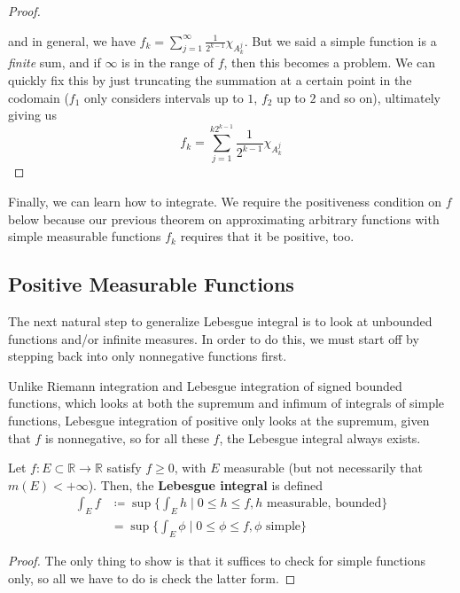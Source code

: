 \begin{proof}
\begin{center}
    \end{center}
    and in general, we have $f_k = \sum_{j=1}^\infty \frac{1}{2^{k-1}} \chi_{A^j_k}$. But we said a simple function is a \textit{finite} sum, and if $\infty$ is in the range of $f$, then this becomes a problem. We can quickly fix this by just truncating the summation at a certain point in the codomain ($f_1$ only considers intervals up to $1$, $f_2$ up to $2$ and so on), ultimately giving us 
    \begin{equation}
      f_k = \sum_{j=1}^{k 2^{k-1}} \frac{1}{2^{k-1}} \chi_{A^j_k} 
    \end{equation}
  \end{proof}

  Finally, we can learn how to integrate. We require the positiveness condition on $f$ below because our previous theorem on approximating arbitrary functions with simple measurable functions $f_k$ requires that it be positive, too. 

\subsection{Positive Measurable Functions} 

  The next natural step to generalize Lebesgue integral is to look at unbounded functions and/or infinite measures. In order to do this, we must start off by stepping back into only nonnegative functions first.

  Unlike Riemann integration and Lebesgue integration of signed bounded functions, which looks at both the supremum and infimum of integrals of simple functions, Lebesgue integration of positive only looks at the supremum, given that $f$ is nonnegative, so for all these $f$, the Lebesgue integral always exists. 

  \begin{definition}
    Let $f: E \subset \mathbb{R} \to \mathbb{R}$ satisfy $f \geq 0$, with $E$ measurable (but not necessarily that $m(E) < +\infty$). Then, the \textbf{Lebesgue integral} is defined 
    \begin{align}
      \int_E f & \coloneqq \sup \bigg\{ \int_E h \; \bigg| \; 0 \leq h \leq f, h \text{ measurable, bounded} \bigg\} \\ 
               & = \sup \bigg\{ \int_E \phi \; \bigg| \; 0 \leq \phi \leq f, \phi \text{ simple} \bigg\}
    \end{align}
  \end{definition}
  \begin{proof}
    The only thing to show is that it suffices to check for simple functions only, so all we have to do is check the latter form. 
  \end{proof} 

